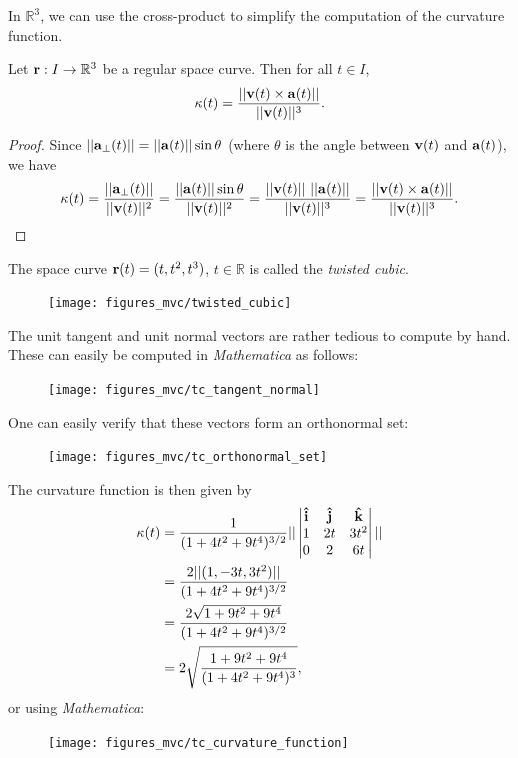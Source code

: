 \documentclass[12pt,letterpaper,reqno]{article}
\numberwithin{equation}{section}
\newcommand{\R}{\ensuremath{\mathbb R}}
\newcommand{\bv}{{\bf v}}
\newcommand{\ba}{{\bf a}}
\newcommand{\bbr}{{\bf r}}
\newcommand{\ii}{{\bf {\hat{i}}}}
\newcommand{\jj}{{\bf {\hat{j}}}}
\newcommand{\kk}{{\bf {\hat{k}}}}
\begin{document}
{In $\R^3$, we can use the cross-product to simplify the computation of the curvature function.

\begin{prop}
	Let $\bbr:I \to \R^3$ be a regular space curve. Then for all $t \in I$,
	\begin{align*}
		\kappa(t)=\frac{||\bv(t) \times \ba(t)||}{||\bv(t)||^3}.
	\end{align*}
\end{prop}

\begin{proof}
	Since $||\ba_{\perp}(t)||=||\ba(t)||\sin \theta$ (where $\theta$ is the angle between $\bv(t)$ and $\ba(t)$), we have
	\begin{align*}
		\kappa(t)=\frac{||\ba_{\perp}(t)||}{||\bv(t)||^2}=\frac{||\ba(t)||\sin \theta}{||\bv(t)||^2}=\frac{||\bv(t)|| \ ||\ba(t)||}{||\bv(t)||^3}=\frac{||\bv(t) \times \ba(t)||}{||\bv(t)||^3}.
	\end{align*}
\end{proof}
 
\begin{example}\label{ex:twisted_cubic}
The space curve $\bbr(t)=(t,t^2,t^3)$, $t \in \R$ is called the \emph{twisted cubic}.
\begin{figure}[h]
	\begin{center}
		\texttt{[image: figures\_mvc/twisted\_cubic]}
	\end{center}
\end{figure}
The unit tangent and unit normal vectors are rather tedious to compute by hand. These can easily be computed in \emph{Mathematica} as follows:

\begin{figure}[h]
	\texttt{[image: figures\_mvc/tc\_tangent\_normal]}
\end{figure}	

One can easily verify that these vectors form an orthonormal set:
\begin{figure}[h]
	\begin{center}
		\texttt{[image: figures\_mvc/tc\_orthonormal\_set]}
	\end{center}
\end{figure}
The curvature function is then given by
\begin{align*}
	\kappa(t)&=\frac{1}{(1+4t^2+9t^4)^{3/2}}||\begin{vmatrix}
		\ii & \jj & \kk \\
		1 & 2t & 3t^2 \\
		0 & 2 & 6t
	\end{vmatrix} || \\
	&=\frac{2||(1,-3t,3t^2)||}{(1+4t^2+9t^4)^{3/2}} \\
	&=\frac{2\sqrt{1+9t^2+9t^4}}{(1+4t^2+9t^4)^{3/2}} \\
	&=2\sqrt{\frac{1+9t^2+9t^4}{(1+4t^2+9t^4)^3}},
\end{align*}
or using \emph{Mathematica}:
\begin{figure}[h]
	\begin{center}
		\texttt{[image: figures\_mvc/tc\_curvature\_function]}
	\end{center}
\end{figure}
\end{example}

}
\end{document}
